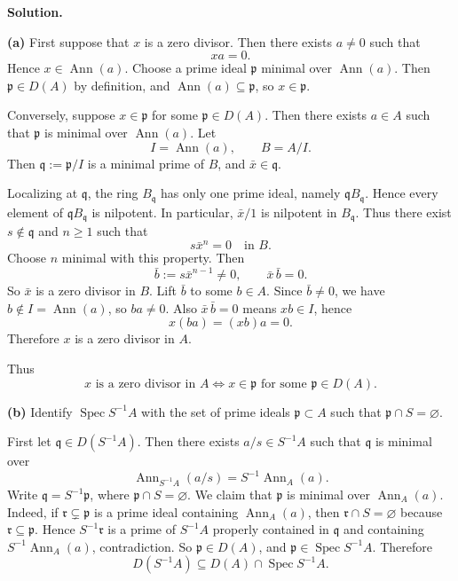 \documentclass[12pt,a4paper]{article}
\theoremstyle{plain}
\theoremstyle{definition}      %
\begin{document}
	\textbf{Solution.}
	
	\textbf{(a)} First suppose that \(x\) is a zero divisor. Then there exists \(a\neq 0\) such that
	\[
	xa=0.
	\]
	Hence \(x\in \operatorname{Ann}(a)\). Choose a prime ideal \(\mathfrak p\) minimal over \(\operatorname{Ann}(a)\). Then \(\mathfrak p\in D(A)\) by definition, and \(\operatorname{Ann}(a)\subseteq \mathfrak p\), so \(x\in \mathfrak p\).
	
	Conversely, suppose \(x\in \mathfrak p\) for some \(\mathfrak p\in D(A)\). Then there exists \(a\in A\) such that \(\mathfrak p\) is minimal over \(\operatorname{Ann}(a)\). Let
	\[
	I=\operatorname{Ann}(a), \qquad B=A/I.
	\]
	Then \(\mathfrak q:=\mathfrak p/I\) is a minimal prime of \(B\), and \(\bar x\in \mathfrak q\).
	
	Localizing at \(\mathfrak q\), the ring \(B_{\mathfrak q}\) has only one prime ideal, namely \(\mathfrak q B_{\mathfrak q}\). Hence every element of \(\mathfrak q B_{\mathfrak q}\) is nilpotent. In particular, \(\bar x/1\) is nilpotent in \(B_{\mathfrak q}\). Thus there exist \(s\notin \mathfrak q\) and \(n\ge 1\) such that
	\[
	s\bar x^n=0 \quad \text{in } B.
	\]
	Choose \(n\) minimal with this property. Then
	\[
	\bar b:=s\bar x^{n-1}\neq 0, \qquad \bar x\,\bar b=0.
	\]
	So \(\bar x\) is a zero divisor in \(B\). Lift \(\bar b\) to some \(b\in A\). Since \(\bar b\neq 0\), we have \(b\notin I=\operatorname{Ann}(a)\), so \(ba\neq 0\). Also \(\bar x\,\bar b=0\) means \(xb\in I\), hence
	\[
	x(ba)=(xb)a=0.
	\]
	Therefore \(x\) is a zero divisor in \(A\).
	
	Thus
	\[
	x \text{ is a zero divisor in } A
	\iff
	x\in \mathfrak p \text{ for some } \mathfrak p\in D(A).
	\]
	
	\medskip
	
	\textbf{(b)} Identify \(\operatorname{Spec} S^{-1}A\) with the set of prime ideals \(\mathfrak p\subset A\) such that \(\mathfrak p\cap S=\varnothing\).
	
	First let \(\mathfrak q\in D(S^{-1}A)\). Then there exists \(a/s\in S^{-1}A\) such that \(\mathfrak q\) is minimal over
	\[
	\operatorname{Ann}_{S^{-1}A}(a/s)=S^{-1}\operatorname{Ann}_A(a).
	\]
	Write \(\mathfrak q=S^{-1}\mathfrak p\), where \(\mathfrak p\cap S=\varnothing\). We claim that \(\mathfrak p\) is minimal over \(\operatorname{Ann}_A(a)\). Indeed, if \(\mathfrak r\subsetneq \mathfrak p\) is a prime ideal containing \(\operatorname{Ann}_A(a)\), then \(\mathfrak r\cap S=\varnothing\) because \(\mathfrak r\subseteq \mathfrak p\). Hence \(S^{-1}\mathfrak r\) is a prime of \(S^{-1}A\) properly contained in \(\mathfrak q\) and containing \(S^{-1}\operatorname{Ann}_A(a)\), contradiction. So \(\mathfrak p\in D(A)\), and \(\mathfrak p\in \operatorname{Spec} S^{-1}A\). Therefore
	\[
	D(S^{-1}A)\subseteq D(A)\cap \operatorname{Spec} S^{-1}A.
	\]
	
\end{document}
